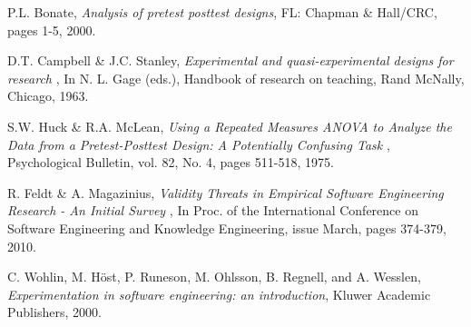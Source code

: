 \begin{thebibliography}{1}
	 P.L. Bonate, {\em Analysis of pretest posttest designs}, FL: Chapman \& Hall/CRC, pages 1-5, 2000.
	
	 D.T. Campbell \& J.C. Stanley, {\em Experimental and quasi-experimental designs for research }, In N. L. Gage (eds.), Handbook of research on teaching, Rand McNally, Chicago, 1963.
	
	 S.W. Huck \& R.A. McLean, {\em Using a Repeated Measures ANOVA to Analyze the Data from a Pretest-Posttest Design: A Potentially Confusing Task }, Psychological Bulletin, vol. 82, No. 4, pages 511-518, 1975. 
	
	 R. Feldt \& A. Magazinius, {\em Validity Threats in Empirical Software Engineering Research - An Initial Survey } , In Proc. of the International Conference on Software Engineering and Knowledge Engineering, issue March, pages 374-379, 2010.
	
	 C. Wohlin, M. H\"ost, P. Runeson, M. Ohlsson, B. Regnell, and A. Wesslen, {\em Experimentation in software engineering: an introduction}, Kluwer Academic Publishers, 2000.
	
	
\end{thebibliography}



